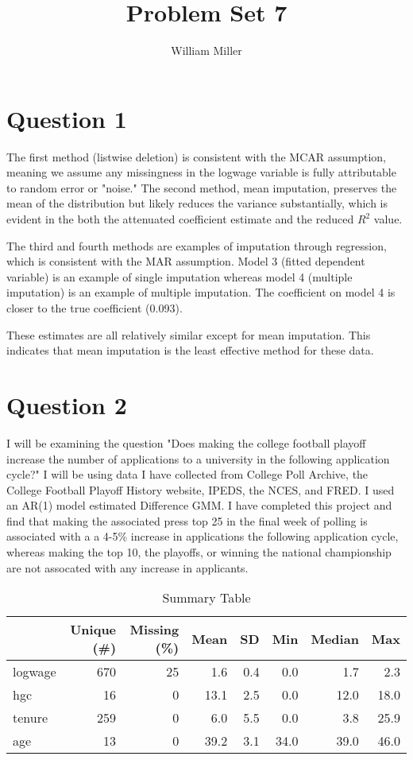 \documentclass{article}
\title{Problem Set 7}
\author{William Miller}
\begin{document}
\maketitle

\section{Question 1}

The first method (listwise deletion) is consistent with the MCAR assumption, meaning we assume any missingness in the logwage variable is fully attributable to random error or "noise." The second method, mean imputation, preserves the mean of the distribution but likely reduces the variance substantially, which is evident in the both the attenuated coefficient estimate and the reduced $R^2$ value.

The third and fourth methods are examples of imputation through regression, which is consistent with the MAR assumption. Model 3 (fitted dependent variable) is an example of single imputation whereas model 4 (multiple imputation) is an example of multiple imputation. The coefficient on model 4 is closer to the true coefficient (0.093).

These estimates are all relatively similar except for mean imputation. This indicates that mean imputation is the least effective method for these data.

\section{Question 2}

I will be examining the question "Does making the college football playoff increase the number of applications to a university in the following application cycle?" I will be using data I have collected from College Poll Archive, the College Football Playoff History website, IPEDS, the NCES, and FRED. I used an AR(1) model estimated Difference GMM. I have completed this project and find that making the associated press top 25 in the final week of polling is associated with a a 4-5\% increase in applications the following application cycle, whereas making the top 10, the playoffs, or winning the national championship are not assocated with any increase in applicants.

\begin{table}
\centering
\caption{Summary Table}
\centering
\begin{tabular}[t]{lrrrrrrr}
\toprule
  & Unique (\#) & Missing (\%) & Mean & SD & Min & Median & Max\\
\midrule
logwage & 670 & 25 & \num{1.6} & \num{0.4} & \num{0.0} & \num{1.7} & \num{2.3}\\
hgc & 16 & 0 & \num{13.1} & \num{2.5} & \num{0.0} & \num{12.0} & \num{18.0}\\
tenure & 259 & 0 & \num{6.0} & \num{5.5} & \num{0.0} & \num{3.8} & \num{25.9}\\
age & 13 & 0 & \num{39.2} & \num{3.1} & \num{34.0} & \num{39.0} & \num{46.0}\\
\bottomrule
\end{tabular}
\end{table}
\end{document}
